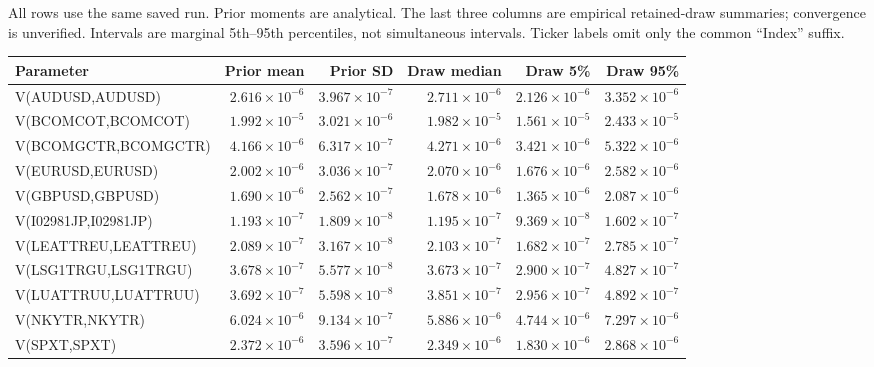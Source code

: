 \documentclass[10pt,a4paper]{article}
\begin{document}
\small All rows use the same saved run. Prior moments are analytical.
The last three columns are empirical retained-draw summaries; convergence is unverified.
Intervals are marginal 5th--95th percentiles, not simultaneous intervals.
Ticker labels omit only the common ``Index'' suffix.
\par\medskip
\begingroup\fontsize{7.8}{10.5}\selectfont\setlength{\tabcolsep}{3pt}
\renewcommand{\arraystretch}{1.45}
\begin{tabular*}{\linewidth}{@{\extracolsep{\fill}}lrrrrr@{}}
\toprule
Parameter & Prior mean & Prior SD & Draw median & Draw 5\% & Draw 95\%\\
\midrule
V(AUDUSD,AUDUSD) & $2.616\times10^{-6}$ & $3.967\times10^{-7}$ & $2.711\times10^{-6}$ & $2.126\times10^{-6}$ & $3.352\times10^{-6}$ \\
V(BCOMCOT,BCOMCOT) & $1.992\times10^{-5}$ & $3.021\times10^{-6}$ & $1.982\times10^{-5}$ & $1.561\times10^{-5}$ & $2.433\times10^{-5}$ \\
V(BCOMGCTR,BCOMGCTR) & $4.166\times10^{-6}$ & $6.317\times10^{-7}$ & $4.271\times10^{-6}$ & $3.421\times10^{-6}$ & $5.322\times10^{-6}$ \\
V(EURUSD,EURUSD) & $2.002\times10^{-6}$ & $3.036\times10^{-7}$ & $2.070\times10^{-6}$ & $1.676\times10^{-6}$ & $2.582\times10^{-6}$ \\
V(GBPUSD,GBPUSD) & $1.690\times10^{-6}$ & $2.562\times10^{-7}$ & $1.678\times10^{-6}$ & $1.365\times10^{-6}$ & $2.087\times10^{-6}$ \\
V(I02981JP,I02981JP) & $1.193\times10^{-7}$ & $1.809\times10^{-8}$ & $1.195\times10^{-7}$ & $9.369\times10^{-8}$ & $1.602\times10^{-7}$ \\
V(LEATTREU,LEATTREU) & $2.089\times10^{-7}$ & $3.167\times10^{-8}$ & $2.103\times10^{-7}$ & $1.682\times10^{-7}$ & $2.785\times10^{-7}$ \\
V(LSG1TRGU,LSG1TRGU) & $3.678\times10^{-7}$ & $5.577\times10^{-8}$ & $3.673\times10^{-7}$ & $2.900\times10^{-7}$ & $4.827\times10^{-7}$ \\
V(LUATTRUU,LUATTRUU) & $3.692\times10^{-7}$ & $5.598\times10^{-8}$ & $3.851\times10^{-7}$ & $2.956\times10^{-7}$ & $4.892\times10^{-7}$ \\
V(NKYTR,NKYTR) & $6.024\times10^{-6}$ & $9.134\times10^{-7}$ & $5.886\times10^{-6}$ & $4.744\times10^{-6}$ & $7.297\times10^{-6}$ \\
V(SPXT,SPXT) & $2.372\times10^{-6}$ & $3.596\times10^{-7}$ & $2.349\times10^{-6}$ & $1.830\times10^{-6}$ & $2.868\times10^{-6}$ \\

\end{tabular*}
\end{document}
